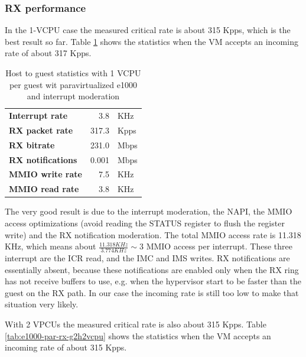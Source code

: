 \subsubsection{RX performance}
In the 1-VCPU case the measured critical rate is about 315 Kpps, which is the best result so far. Table \ref{tab:e1000-par-rx-g2h1vcpu}
shows the statistics when the VM accepts an incoming rate of about 317 Kpps.

\begin{table}
\begin{center}
\begin{tabular}{lrl}
\toprule
\textbf{Interrupt rate} & 3.8 & KHz\\
\textbf{RX packet rate} & 317.3 & Kpps\\
\textbf{RX bitrate} & 231.0 & Mbps\\
\textbf{RX notifications} & 0.001 & Mbps\\
\textbf{MMIO write rate} & 7.5 & KHz\\
\textbf{MMIO read rate} & 3.8 & KHz\\
\bottomrule
\end{tabular}
\end{center}
\caption{Host to guest statistics with 1 VCPU per guest wit paravirtualized e1000 and interrupt moderation}
\label{tab:e1000-par-rx-g2h1vcpu}
\end{table}

The very good result is due to the interrupt moderation, the NAPI, the MMIO access optimizations (avoid reading the STATUS register to
flush the register write) and the RX notification moderation.
The total MMIO access rate is 11.318 KHz, which means about $\frac{11.318 KHz}{3.774 KHz} \sim 3$ MMIO access per interrupt. These three
interrupt are the ICR read, and the IMC and IMS writes. RX notifications are essentially absent, because these notifications are enabled
only when the RX ring has not receive buffers to use, e.g. when the hypervisor start to be faster than the guest on the RX path.
In our case the incoming rate is still too low to make that situation very likely.

\vspace{0.5cm}

With 2 VPCUs the measured critical rate is also about 315 Kpps. Table \ref{tab:e1000-par-rx-g2h2vcpu}
shows the statistics when the VM accepts an incoming rate of about 315 Kpps.

